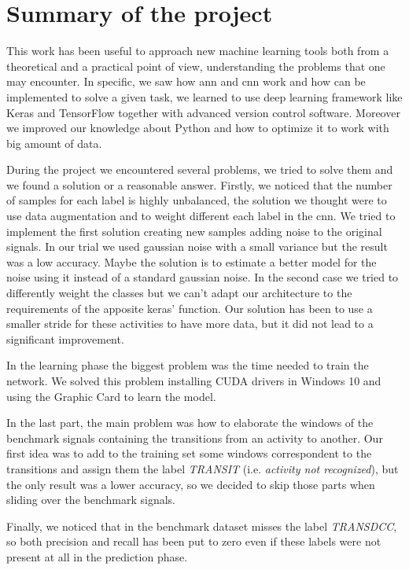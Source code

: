 
\section{Summary of the project}
\label{sec:summary}
This work has been useful to approach new machine learning tools both from a theoretical and a practical point of view, understanding the problems that one may encounter.
In specific, we saw how \gls{ann} and \gls{cnn} work and how can be implemented to solve a given task, we learned to use deep learning framework like Keras and TensorFlow together with advanced version control software. Moreover we improved our knowledge about Python and how to optimize it to work with big amount of data.

During the project we encountered several problems, we tried to solve them and we found a solution or a reasonable answer.
Firstly, we noticed that the number of samples for each label is highly unbalanced, the solution we thought were to use data augmentation and to weight different each label in the \gls{cnn}. We tried to implement the first solution creating new samples adding noise to the original signals. In our trial we used gaussian noise with a small variance but the result was a low accuracy. Maybe the solution is to estimate a better model for the noise using it instead of a standard gaussian noise.
In the second case we tried to differently weight the classes but we can't adapt our architecture to the requirements of the apposite keras' function.
Our solution has been to use a smaller stride for these activities to have more data, but it did not lead to a significant improvement.

In the learning phase the biggest problem was the time needed to train the network. We solved this problem installing CUDA drivers in Windows 10 and using the Graphic Card to learn the model.

In the last part, the main problem was how to elaborate the windows of the benchmark signals containing the transitions from an activity to another. Our first idea was to add to the training set some windows correspondent to the transitions and assign them the label \textit{TRANSIT} (i.e. \textit{activity not recognized}), but the only result was a lower accuracy, so we decided to skip those parts when sliding over the benchmark signals.

Finally, we noticed that in the benchmark dataset misses the label \textit{TRANSDCC}, so both precision and recall has been put to zero even if these labels were not present at all in the prediction phase.

